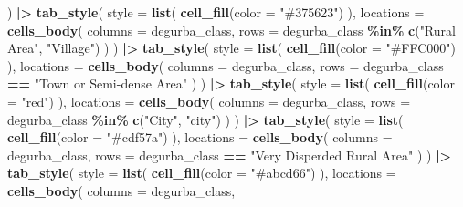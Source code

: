\documentclass[
]{article}
\newenvironment{Shaded}{\begin{snugshade}}{\end{snugshade}}
\newcommand{\AttributeTok}[1]{\textcolor[rgb]{0.13,0.29,0.53}{#1}}
\newcommand{\FunctionTok}[1]{\textcolor[rgb]{0.13,0.29,0.53}{\textbf{#1}}}
\newcommand{\NormalTok}[1]{#1}
\newcommand{\SpecialCharTok}[1]{\textcolor[rgb]{0.81,0.36,0.00}{\textbf{#1}}}
\newcommand{\StringTok}[1]{\textcolor[rgb]{0.31,0.60,0.02}{#1}}
\begin{document}
{\begin{Shaded}
\begin{Highlighting}[]
\NormalTok{  ) }\SpecialCharTok{|\textgreater{}}
  \FunctionTok{tab\_style}\NormalTok{(}
    \AttributeTok{style =} \FunctionTok{list}\NormalTok{(}
      \FunctionTok{cell\_fill}\NormalTok{(}\AttributeTok{color =} \StringTok{"\#375623"}\NormalTok{) }
\NormalTok{      ),}
    \AttributeTok{locations =} \FunctionTok{cells\_body}\NormalTok{(}
      \AttributeTok{columns =}\NormalTok{ degurba\_class,}
      \AttributeTok{rows =}\NormalTok{ degurba\_class }\SpecialCharTok{\%in\%} \FunctionTok{c}\NormalTok{(}\StringTok{"Rural Area"}\NormalTok{, }\StringTok{"Village"}\NormalTok{)}
\NormalTok{      )}
\NormalTok{  ) }\SpecialCharTok{|\textgreater{}}
  \FunctionTok{tab\_style}\NormalTok{(}
    \AttributeTok{style =} \FunctionTok{list}\NormalTok{(}
      \FunctionTok{cell\_fill}\NormalTok{(}\AttributeTok{color =} \StringTok{"\#FFC000"}\NormalTok{) }
\NormalTok{      ),}
    \AttributeTok{locations =} \FunctionTok{cells\_body}\NormalTok{(}
      \AttributeTok{columns =}\NormalTok{ degurba\_class,}
      \AttributeTok{rows =}\NormalTok{ degurba\_class }\SpecialCharTok{==} \StringTok{"Town or Semi{-}dense Area"}
\NormalTok{    )}
\NormalTok{  ) }\SpecialCharTok{|\textgreater{}}
  \FunctionTok{tab\_style}\NormalTok{(}
    \AttributeTok{style =} \FunctionTok{list}\NormalTok{(}
      \FunctionTok{cell\_fill}\NormalTok{(}\AttributeTok{color =} \StringTok{"red"}\NormalTok{)}
\NormalTok{      ),}
    \AttributeTok{locations =} \FunctionTok{cells\_body}\NormalTok{(}
      \AttributeTok{columns =}\NormalTok{ degurba\_class,}
      \AttributeTok{rows =}\NormalTok{ degurba\_class }\SpecialCharTok{\%in\%} \FunctionTok{c}\NormalTok{(}\StringTok{"City"}\NormalTok{, }\StringTok{"city"}\NormalTok{)}
\NormalTok{    )}
\NormalTok{  ) }\SpecialCharTok{|\textgreater{}}
  \FunctionTok{tab\_style}\NormalTok{(}
    \AttributeTok{style =} \FunctionTok{list}\NormalTok{(}
      \FunctionTok{cell\_fill}\NormalTok{(}\AttributeTok{color =} \StringTok{"\#cdf57a"}\NormalTok{)}
\NormalTok{      ),}
    \AttributeTok{locations =} \FunctionTok{cells\_body}\NormalTok{(}
      \AttributeTok{columns =}\NormalTok{ degurba\_class,}
      \AttributeTok{rows =}\NormalTok{ degurba\_class }\SpecialCharTok{==} \StringTok{"Very Disperded Rural Area"}
\NormalTok{    )}
\NormalTok{  ) }\SpecialCharTok{|\textgreater{}}
  \FunctionTok{tab\_style}\NormalTok{(}
    \AttributeTok{style =} \FunctionTok{list}\NormalTok{(}
      \FunctionTok{cell\_fill}\NormalTok{(}\AttributeTok{color =} \StringTok{"\#abcd66"}\NormalTok{)}
\NormalTok{      ),}
    \AttributeTok{locations =} \FunctionTok{cells\_body}\NormalTok{(}
      \AttributeTok{columns =}\NormalTok{ degurba\_class,}

\end{Highlighting}
\end{Shaded}}
\end{document}
